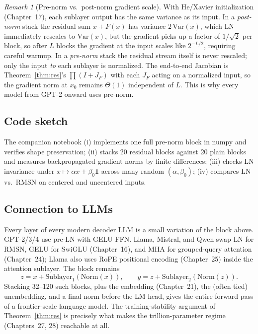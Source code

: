 \documentclass[11pt]{article}
\theoremstyle{remark}
\newtheorem{remark}[theorem]{Remark}
\begin{document}
\begin{remark}[Pre-norm vs.\ post-norm gradient scale]
With He/Xavier initialization (Chapter~17), each sublayer output has the same variance as its input. In a \emph{post-norm} stack the residual sum $x + F(x)$ has variance $2\,\mathrm{Var}(x)$, which LN immediately rescales to $\mathrm{Var}(x)$, but the gradient picks up a factor of $1/\sqrt 2$ per block, so after $L$ blocks the gradient at the input scales like $2^{-L/2}$, requiring careful warmup. In a \emph{pre-norm} stack the residual stream itself is never rescaled; only the input \emph{to} each sublayer is normalized. The end-to-end Jacobian is Theorem~\ref{thm:res}'s $\prod(I + J_F)$ with each $J_F$ acting on a normalized input, so the gradient norm at $x_0$ remains $\Theta(1)$ independent of $L$. This is why every model from GPT-2 onward uses pre-norm.
\end{remark}

\subsection*{Code sketch}

The companion notebook (i) implements one full pre-norm block in numpy and verifies shape preservation; (ii) stacks 20 residual blocks against 20 plain blocks and measures backpropagated gradient norms by finite differences; (iii) checks LN invariance under $x \mapsto \alpha x + \beta_0 \mathbf{1}$ across many random $(\alpha, \beta_0)$; (iv) compares LN vs.\ RMSN on centered and uncentered inputs.

\subsection*{Connection to LLMs}

Every layer of every modern decoder LLM is a small variation of the block above. GPT-2/3/4 use pre-LN with GELU FFN. Llama, Mistral, and Qwen swap LN for RMSN, GELU for SwiGLU (Chapter~16), and MHA for grouped-query attention (Chapter~24); Llama also uses RoPE positional encoding (Chapter~25) inside the attention sublayer. The block remains
\[
  z = x + \mathrm{Sublayer}_1(\mathrm{Norm}(x)),
  \qquad
  y = z + \mathrm{Sublayer}_2(\mathrm{Norm}(z)).
\]
Stacking 32--120 such blocks, plus the embedding (Chapter~21), the (often tied) unembedding, and a final norm before the LM head, gives the entire forward pass of a frontier-scale language model. The training-stability argument of Theorem~\ref{thm:res} is precisely what makes the trillion-parameter regime (Chapters~27, 28) reachable at all.
\end{document}

